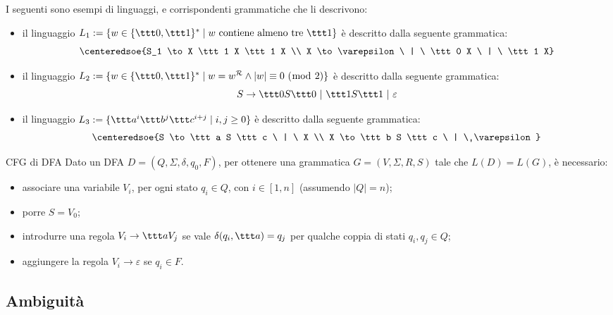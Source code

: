 \documentclass[a4paper, 12pt]{report}
\begin{document}
    \begin{example}
        I seguenti sono esempi di linguaggi, e corrispondenti grammatiche che li descrivono:

        \begin{itemize}
            \item il linguaggio $L_1 := \{w \in \{\ttt 0, \ttt 1\}^* \mid w \ \mathrm{contiene \ almeno \ tre \ \ttt 1}\}$ è descritto dalla seguente grammatica: $$\centeredsoe{S_1 \to X \ttt 1 X \ttt 1 X \\ X \to \varepsilon \ | \ \ttt 0 X \ | \ \ttt 1 X}$$
            \item il linguaggio $L_2 := \{w \in \{\ttt 0, \ttt 1\}^* \mid w = w ^\mathcal{R} \land |w| \equiv 0 \ (\bmod \ 2)\}$ è descritto dalla seguente grammatica: $$S \to \ttt 0 S \ttt 0 \ | \ \ttt 1 S \ttt 1 \ | \ \varepsilon$$
            \item il linguaggio $L_3 := \{\ttt a^i \ttt b^j \ttt c^{i + j} \mid i, j \ge 0\}$ è descritto dalla seguente grammatica: $$\centeredsoe{S \to \ttt a S \ttt c \ | \ X \\ X \to \ttt b S \ttt c \ | \ \varepsilon}$$
        \end{itemize}
    \end{example}

    \begin{framedmeth}{CFG di DFA}
        Dato un DFA $D = (Q, \Sigma, \delta, q_0, F)$, per ottenere una grammatica $G = (V, \Sigma, R, S)$ tale che $L(D) = L(G)$, è necessario:

        \begin{itemize}
            \item associare una variabile $V_i$, per ogni stato $q_i \in Q$, con $i \in [1, n]$ (assumendo $|Q| = n$);
            \item porre $S = V_0$;
            \item introdurre una regola $V_i \to \ttt a V_j$ se vale $\delta(q_i, \ttt a) = q_j$ per qualche coppia di stati $q_i, q_j \in Q$;
            \item aggiungere la regola $V_i \to \varepsilon$ se $q_i \in F$.
        \end{itemize}
    \end{framedmeth}
   
    \subsection{Ambiguità}
\end{document}
